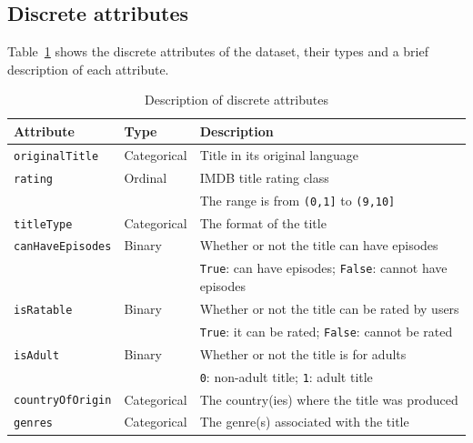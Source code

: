 \subsection{Discrete attributes}
Table~\ref{tab:attributes} shows the discrete attributes of the dataset,
their types and a brief description of each attribute.
\begin{table}[h]
    \centering
    \begin{tabular}{|l|l|l|} %
        \hline
        \textbf{Attribute} & \textbf{Type} & \textbf{Description} \\ 
        \hline
        \texttt{originalTitle} & Categorical & Title in its original language \\  
        \hline
        \texttt{rating} & Ordinal & IMDB title rating class \\
        & & The range is from \texttt{(0,1]} to \texttt{(9,10]} \\ 
        \hline
        \texttt{titleType} & Categorical & The format of the title \\ 
        \hline
        \texttt{canHaveEpisodes} & Binary & Whether or not the title can have episodes \\ 
        & & \texttt{True}: can have episodes; \texttt{False}: cannot have episodes \\ 
        \hline
        \texttt{isRatable} & Binary & Whether or not the title can be rated by users \\ 
        & & \texttt{True}: it can be rated; \texttt{False}: cannot be rated \\ 
        \hline
        \texttt{isAdult} & Binary & Whether or not the title is for adults \\ 
        & & \texttt{0}: non-adult title; \texttt{1}: adult title \\ 
        \hline
        \texttt{countryOfOrigin} & Categorical & The country(ies) where the title was produced \\ 
        \hline
        \texttt{genres} & Categorical & The genre(s) associated with the title \\ 
        \hline
    \end{tabular}
    \caption{Description of discrete attributes}
    \label{tab:attributes}
\end{table}


